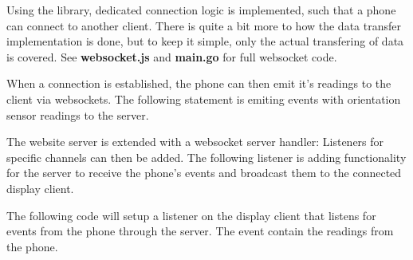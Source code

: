 Using the library, dedicated connection logic is implemented, such that a phone can connect to another client.
There is quite a bit more to how the data transfer implementation is done, but to keep it simple, only the actual transfering of data is covered.
See \textbf{websocket.js} and \textbf{main.go} for full websocket code. 

When a connection is established, the phone can then emit it's readings to the client via websockets.
The following statement is emiting events with orientation sensor readings to the server.


The website server is extended with a websocket server handler:
Listeners for specific channels can then be added. 
The following listener is adding functionality for the server to receive the phone's events and broadcast them to the connected display client.

The following code will setup a listener on the display client that listens for events from the phone through the server. The event contain the readings from the phone.

